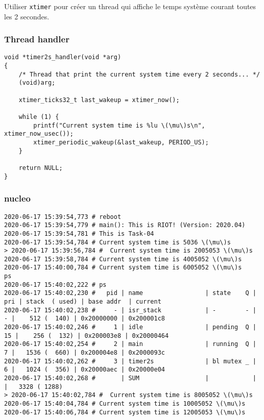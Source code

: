 Utiliser \texttt{xtimer} pour créer un thread qui affiche le temps
système courant toutes les 2 secondes.\\

\subsubsection{Thread handler}
{\small
\begin{lstlisting}
void *timer2s_handler(void *arg)
{
    /* Thread that print the current system time every 2 seconds... */
    (void)arg;
    
    xtimer_ticks32_t last_wakeup = xtimer_now();

    while (1) {
        printf("Current system time is %lu \(\mu\)s\n", xtimer_now_usec());
        xtimer_periodic_wakeup(&last_wakeup, PERIOD_US);
    }

    return NULL;
}
\end{lstlisting}
}
\subsubsection{nucleo}
{\scriptsize
\begin{verbatim}
2020-06-17 15:39:54,773 # reboot
2020-06-17 15:39:54,779 # main(): This is RIOT! (Version: 2020.04)
2020-06-17 15:39:54,781 # This is Task-04
2020-06-17 15:39:54,784 # Current system time is 5036 \(\mu\)s
> 2020-06-17 15:39:56,784 #  Current system time is 2005053 \(\mu\)s
2020-06-17 15:39:58,784 # Current system time is 4005052 \(\mu\)s
2020-06-17 15:40:00,784 # Current system time is 6005052 \(\mu\)s
ps
2020-06-17 15:40:02,222 # ps
2020-06-17 15:40:02,230 # 	pid | name                 | state    Q | pri | stack  ( used) | base addr  | current     
2020-06-17 15:40:02,238 # 	  - | isr_stack            | -        - |   - |    512 (  140) | 0x20000000 | 0x200001c8
2020-06-17 15:40:02,246 # 	  1 | idle                 | pending  Q |  15 |    256 (  132) | 0x200003e8 | 0x20000464 
2020-06-17 15:40:02,254 # 	  2 | main                 | running  Q |   7 |   1536 (  660) | 0x200004e8 | 0x2000093c 
2020-06-17 15:40:02,262 # 	  3 | timer2s              | bl mutex _ |   6 |   1024 (  356) | 0x20000aec | 0x20000e04 
2020-06-17 15:40:02,268 # 	    | SUM                  |            |     |   3328 ( 1288)
> 2020-06-17 15:40:02,784 #  Current system time is 8005052 \(\mu\)s
2020-06-17 15:40:04,784 # Current system time is 10005052 \(\mu\)s
2020-06-17 15:40:06,784 # Current system time is 12005053 \(\mu\)s
\end{verbatim}
}


